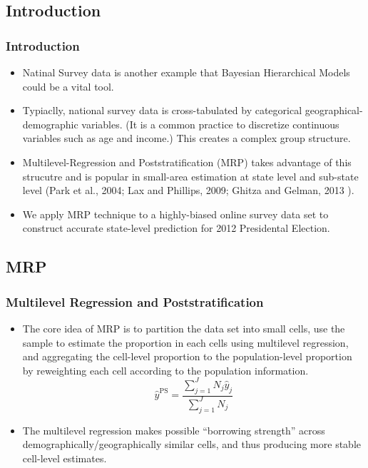 \documentclass[xetex,mathserif,serif]{beamer}
\begin{document}
\subsection{Introduction}
\begin{frame}
  \frametitle{Introduction}
  \begin{itemize}
  \item Natinal Survey data is another example that Bayesian Hierarchical Models
    could be a vital tool.
  \item Typiaclly, national survey data is cross-tabulated by
    categorical geographical-demographic variables. (It is a common practice to
    discretize continuous variables such as age and income.) This creates a complex
    group structure. 
  \item Multilevel-Regression and Poststratification (MRP) takes advantage of
    this strucutre and is popular in small-area estimation at state level and
    sub-state level (Park et al., 2004; Lax and Phillips, 2009; Ghitza and
    Gelman, 2013 ).
  \item We apply MRP technique to a highly-biased online survey data set to
    construct accurate state-level prediction for 2012 Presidental Election.
  \end{itemize}
\end{frame}
\subsection{MRP}
\begin{frame}
  \frametitle{Multilevel Regression and Poststratification}
  \begin{itemize}
  \item The core idea of MRP is to partition the data set into small cells, use
    the sample to estimate the proportion in each cells using multilevel
    regression, and aggregating the cell-level proportion to the population-level
    proportion by reweighting each cell according to the population information.
    \[\hat{y}^{\text{PS}}=\frac{\sum_{j=1}^JN_j\hat{y}_j}{\sum_{j=1}^JN_j}\]
  \item The multilevel regression makes possible ``borrowing strength'' across
    demographically/geographically similar cells, and thus producing more stable
    cell-level estimates.
  \end{itemize}
\end{frame}
\end{document}
